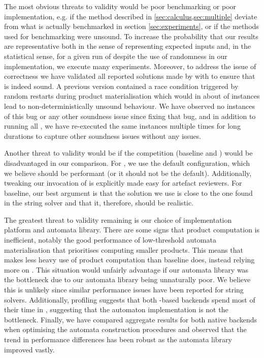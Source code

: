 The most obvious threats to validity would be poor benchmarking or poor
implementation, e.g. if the method described in \cref{sec:calculus,sec:multiple}
deviate from what is actually benchmarked in section \cref{sec:experiments}, or
if the methods used for benchmarking were unsound. To increase the probability
that our results are representative both in the sense of representing expected
inputs and, in the statistical sense, for a given run of \Catra{} despite the
use of randomness in our implementation, we execute many experiments. Moreover,
to address the issue of correctness we have validated all reported solutions
made by \Calculus{} with \Nuxmv{} to ensure that \Calculus{} is indeed sound. A
previous version contained a race condition triggered by random restarts during
product materialisation which would in about  of instances lead to
non-deterministically unsound behaviour. We have observed no instances of this
bug or any other soundness issue since fixing that bug, and in addition to
running all \NrBenchmarks{}, we have re-executed the same instances multiple
times for long durations to capture other soundness issues without any issues.

Another threat to validity would be if the competition (baseline and \Nuxmv)
would be disadvantaged in our comparison. For \Nuxmv{}, we use the default
configuration, which we believe should be performant (or it should not be the
default). Additionally, tweaking our invocation of \Nuxmv{} is explicitly made
easy for artefact reviewers. For baseline, our best argument is that the
solution we use is close to the one found in the \Ostrich{} string solver and
that it, therefore, should be realistic.

The greatest threat to validity remaining is our choice of implementation
platform and automata library. There are some signs that product computation
is inefficient, notably the good performance of low-threshold automata
materialisation that prioritises computing smaller products. This means that
\Calculus{} makes less heavy use of product computation than baseline does,
instead relying more on \Princess{}. This situation would unfairly advantage
\Calculus{} if our automata library was the bottleneck due to our automata
library being unnaturally poor. We believe this is unlikely since similar
performance issues have been reported for string solvers. Additionally,
profiling suggests that both \Princess{}-based backends spend most of their time
in \Princess{}, suggesting that the automaton implementation is not the
bottleneck. Finally, we have compared aggregate results for both native backends
when optimising the automata construction procedures and observed that the trend
in performance differences has been robust as the automata library improved
vastly.

